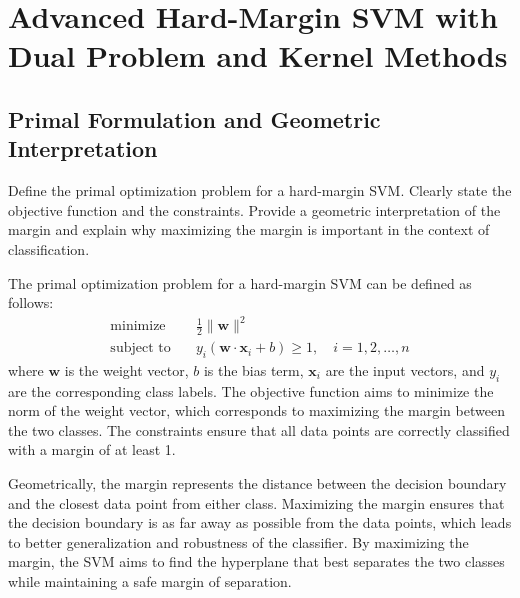 \section{Advanced Hard-Margin SVM with Dual Problem and Kernel Methods}

\subsection{Primal Formulation and Geometric Interpretation}
Define the primal optimization problem for a hard-margin SVM. Clearly state the objective function and the constraints. Provide a geometric interpretation of the margin and explain why maximizing the margin is important in the context of classification.
\begin{qsolve}
    \begin{qsolve}[]
        The primal optimization problem for a hard-margin SVM can be defined as follows:
        \begin{align*}
            \text{minimize} \quad & \frac{1}{2} \|\mathbf{w}\|^2 \\
            \text{subject to} \quad & y_i(\mathbf{w} \cdot \mathbf{x}_i + b) \geq 1, \quad i = 1, 2, \ldots, n
        \end{align*}
        where $\mathbf{w}$ is the weight vector, $b$ is the bias term, $\mathbf{x}_i$ are the input vectors, and $y_i$ are the corresponding class labels. The objective function aims to minimize the norm of the weight vector, which corresponds to maximizing the margin between the two classes. The constraints ensure that all data points are correctly classified with a margin of at least 1.

        Geometrically, the margin represents the distance between the decision boundary and the closest data point from either class. Maximizing the margin ensures that the decision boundary is as far away as possible from the data points, which leads to better generalization and robustness of the classifier. By maximizing the margin, the SVM aims to find the hyperplane that best separates the two classes while maintaining a safe margin of separation.
        
    \end{qsolve}
\end{qsolve}
